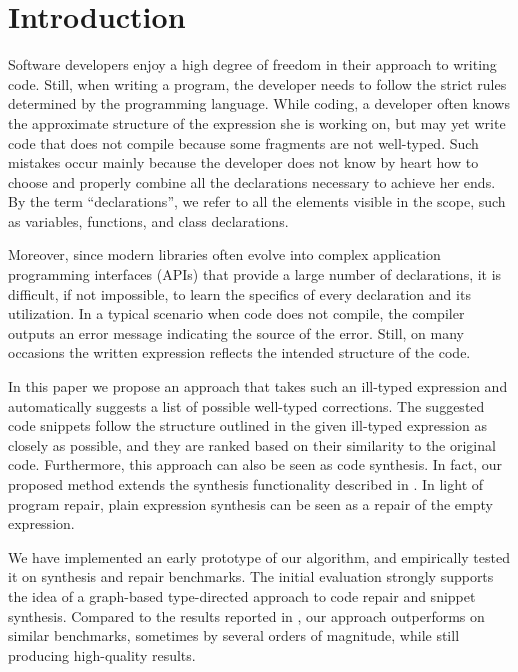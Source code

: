\section{Introduction}
\label{sec:intro}
Software developers enjoy a high degree of freedom in their approach to writing code. Still, when writing a program, the developer needs to follow the strict rules determined by the programming language. While coding, a developer often knows the approximate structure of the expression she is working on, but may yet write code that does not compile because some fragments are not well-typed. Such mistakes occur mainly because the developer does not know by heart how to choose and properly combine all the declarations necessary to achieve her ends. By the term ``declarations'', we refer to all the elements visible in the scope, such as variables, functions, and class declarations.

Moreover, since modern libraries often evolve into complex application programming interfaces (APIs) that provide a large number of declarations, it is difficult, if not impossible, to learn the specifics of every declaration and its utilization. In a typical scenario when code does not compile, the compiler outputs an error message indicating the source of the error. Still, on many occasions the written expression reflects the intended structure of the code.

In this paper we propose an approach that takes such an ill-typed expression and automatically suggests a list of possible well-typed corrections. The suggested code snippets follow the structure outlined in the given ill-typed expression as closely as possible, and they are ranked based on their similarity to the original code. Furthermore, this approach can also be seen as code synthesis. In fact, our proposed method extends the synthesis functionality described in \cite{MandelinetALL2005Jungloid, GveroETAL13CompleteCompletionTypesWeights, PerelmanGBG12}. In light of program repair, plain expression synthesis can be seen as a repair of the empty expression.


We have implemented an early prototype of our algorithm, and empirically tested it on synthesis and repair benchmarks. The initial evaluation strongly supports the idea of a graph-based type-directed approach to code repair and snippet synthesis. Compared to the results reported in \cite{GveroETAL13CompleteCompletionTypesWeights}, our approach outperforms on similar benchmarks, sometimes by several orders of magnitude, while still producing high-quality results.
